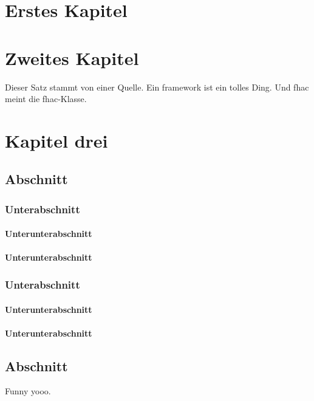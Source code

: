 \chapter{Erstes Kapitel}\label{ch:example1}
\Blindtext[5][3]

\chapter{Zweites Kapitel}\label{ch:example2}
Dieser Satz stammt von einer Quelle.\cite{github}
Ein \Gls{framework} ist ein tolles Ding.
Und \ac{fhac} meint die \ac{fhac}-Klasse.

\chapter{Kapitel drei}\label{ch:example3}
\section{Abschnitt}\label{sec:example3}
\subsection{Unterabschnitt}\label{subsec:example3-1}
\subsubsection{Unterunterabschnitt}\label{subsubsec:example3-1-1}
\subsubsection{Unterunterabschnitt}\label{subsubsec:example3-1-2}
\subsection{Unterabschnitt}\label{subsec:example3-2}
\subsubsection{Unterunterabschnitt}\label{subsubsec:example3-2-1}
\subsubsection{Unterunterabschnitt}\label{subsubsec:example3-2-2}
\section{Abschnitt}\label{sec:example4}
Funny yooo.